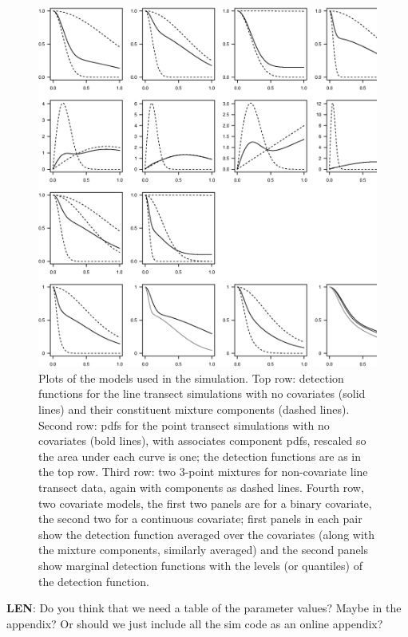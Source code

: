 \documentclass[useAMS,referee, usegraphicx]{biom}
\begin{document}
\begin{figure}
\centering
\includegraphics[width=\textwidth]{figs/sim-detfct.eps}
\caption{Plots of the models used in the simulation. Top row: detection functions for the line transect simulations with no covariates (solid lines) and their constituent mixture components (dashed lines). Second row: pdfs for the point transect simulations with no covariates (bold lines), with associates component pdfs, rescaled so the area under each curve is one; the detection functions are as in the top row. Third row: two 3-point mixtures for non-covariate line transect data, again with components as dashed lines. Fourth row, two covariate models, the first two panels are for a binary covariate, the second two for a continuous covariate; first panels in each pair show the detection function averaged over the covariates (along with the mixture components, similarly averaged) and the second panels show marginal detection functions with the levels (or quantiles) of the detection function.}
\label{sim-detfcts}
\end{figure}

\textbf{LEN}: Do you think that we need a table of the parameter values? Maybe in the appendix? Or should we just include all the sim code as an online appendix?
\end{document}
